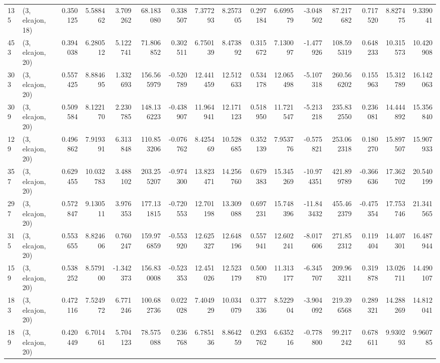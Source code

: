 \begin{tabular}{llrrrrrrrrrrrrrr}
135 &  (3, elcajon, 18) &   0.350125 &   5.588462 &   3.709262 &    68.183080 &   0.338507 &   7.377293 &   8.257305 &  0.297184 &   6.699579 &  -3.048502 &    87.217682 &   0.717520 &   8.827475 &   9.339041 \\
453 &  (3, elcajon, 20) &   0.394038 &   6.280512 &   5.122741 &    71.806852 &   0.302511 &   6.750139 &   8.473892 &  0.315672 &   7.130097 &  -1.477926 &   108.595319 &   0.648233 &  10.315573 &  10.420908 \\
303 &  (3, elcajon, 20) &   0.557425 &   8.884695 &   1.332693 &   156.565979 &  -0.520789 &  12.441459 &  12.512633 &  0.534178 &  12.065498 &  -5.107318 &   260.566202 &   0.155963 &  15.312789 &  16.142063 \\
309 &  (3, elcajon, 20) &   0.509584 &   8.122170 &   2.230785 &   148.136223 &  -0.438907 &  11.964941 &  12.171123 &  0.518950 &  11.721547 &  -5.213218 &   235.832550 &   0.236081 &  14.444892 &  15.356840 \\
129 &  (3, elcajon, 20) &   0.496862 &   7.919391 &   6.313848 &   110.853206 &  -0.076762 &   8.425469 &  10.528685 &  0.352139 &   7.953776 &  -0.575821 &   253.062318 &   0.180270 &  15.897507 &  15.907933 \\
357 &  (3, elcajon, 20) &   0.629455 &  10.032783 &   3.488102 &   203.255207 &  -0.974300 &  13.823471 &  14.256760 &  0.679383 &  15.345269 & -10.974351 &   421.899789 &  -0.366636 &  17.362702 &  20.540199 \\
297 &  (3, elcajon, 20) &   0.572847 &   9.130511 &   3.976353 &   177.131815 &  -0.720553 &  12.701198 &  13.309088 &  0.697231 &  15.748396 & -11.843432 &   455.462379 &  -0.475354 &  17.753746 &  21.341565 \\
315 &  (3, elcajon, 20) &   0.553655 &   8.824606 &   0.760247 &   159.976859 &  -0.553920 &  12.625327 &  12.648196 &  0.557941 &  12.602241 &  -8.017606 &   271.852312 &   0.119404 &  14.407301 &  16.487944 \\
159 &  (3, elcajon, 20) &   0.538252 &   8.579100 &  -1.342373 &   156.830008 &  -0.523353 &  12.451026 &  12.523179 &  0.500870 &  11.313177 &  -6.345707 &   209.963211 &   0.319878 &  13.026711 &  14.490107 \\
183 &  (3, elcajon, 20) &   0.472116 &   7.524972 &   6.771246 &   100.682736 &   0.022028 &   7.404929 &  10.034079 &  0.377336 &   8.522904 &  -3.904092 &   219.396568 &   0.289321 &  14.288269 &  14.812041 \\
189 &  (3, elcajon, 20) &   0.420449 &   6.701461 &   5.704123 &    78.575088 &   0.236768 &   6.785136 &   8.864259 &  0.293762 &   6.635216 &  -0.778800 &    99.217242 &   0.678611 &   9.930293 &   9.960785 \\

\end{tabular}
